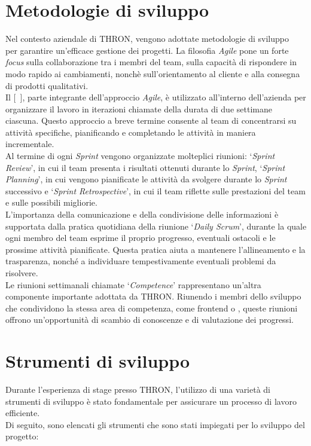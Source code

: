 \section{Metodologie di sviluppo}\label{sec:metodologie-sviluppo}
Nel contesto aziendale di THRON, vengono adottate metodologie di sviluppo ~\cite{site:agile-manifesto} per garantire un'efficace
gestione dei progetti. La filosofia \textit{Agile} pone un forte \textit{focus} sulla collaborazione tra i membri del team,
sulla capacità di rispondere in modo rapido ai cambiamenti, nonchè sull'orientamento al cliente e alla consegna di prodotti qualitativi.\\
Il   [~\cite{site:scrum}], parte integrante dell'approccio \textit{Agile}, è utilizzato all'interno dell'azienda per organizzare il lavoro in iterazioni chiamate
 della durata di due settimane ciascuna. Questo approccio a breve termine consente al team di concentrarsi su attività specifiche, pianificando
e completando le attività in maniera incrementale.\\
Al termine di ogni \textit{Sprint} vengono organizzate molteplici riunioni: `\textit{Sprint Review}', in cui il team presenta i risultati ottenuti durante lo \textit{Sprint},
`\textit{Sprint Planning}', in cui vengono pianificate le attività da svolgere durante lo \textit{Sprint} successivo e `\textit{Sprint Retrospective}', in cui il team riflette sulle prestazioni del team e sulle possibili migliorie.\\
L'importanza della comunicazione e della condivisione delle informazioni è supportata dalla pratica quotidiana della riunione `\textit{Daily Scrum}', durante la quale
ogni membro del team esprime il proprio progresso, eventuali ostacoli e le prossime attività pianificate. Questa pratica aiuta a mantenere l'allineamento e
la trasparenza, nonché a individuare tempestivamente eventuali problemi da risolvere.\\
Le riunioni settimanali chiamate `\textit{Competence}' rappresentano un'altra componente importante adottata da THRON. Riunendo i membri dello sviluppo 
che condividono la stessa area di competenza, come frontend o , queste riunioni offrono un'opportunità di scambio di conoscenze e di valutazione dei progressi.
\section{Strumenti di sviluppo}\label{sec:strumenti-sviluppo}
Durante l'esperienza di stage presso THRON, l'utilizzo di una varietà di strumenti di sviluppo è stato fondamentale per assicurare un processo di lavoro efficiente.\\
Di seguito, sono elencati gli strumenti che sono stati impiegati per lo sviluppo del progetto:

